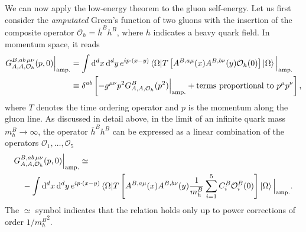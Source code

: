 We can now apply the low-energy theorem to the gluon self-energy. Let us first consider the \textit{amputated} Green's function of two gluons with the insertion of the composite operator $\mathcal{O}_h = \bar{h}^B h^B$, where $h$ indicates a heavy quark field. In momentum space, it reads
\begin{equation}
\begin{split}
G_{A,A,\mathcal{O}_h}^{B,ab\,\mu\nu} (p, 0) \Big \vert_{\text{amp.}} &=  \int \mathrm{d}^d x\, \mathrm{d}^d y\, e^{ip \cdot (x - y)} \braket{\Omega|T\left[ A^{B,a\mu}(x) A^{B, b\nu}(y) \mathcal{O}_h(0) \right]|\Omega} \Big \vert_{\text{amp.}} \\
& \equiv \delta^{ab} \left[-g^{\mu\nu} p^2 G_{A,A,\mathcal{O}_h}^B(p^2)\Big \vert_{\text{amp.}} + \text{terms proportional to } p^\mu p^\nu \right],
\end{split}
\end{equation}
where $T$ denotes the time ordering operator and $p$ is the momentum along the gluon line. As discussed in detail above, in the limit of an infinite quark mass $m_h^B \rightarrow \infty$, the operator $\bar{h}^B h^B$ can be expressed as a linear combination of the operators $\mathcal{O}_1,\ldots , \mathcal{O}_5$
\begin{equation}
\begin{split}
&G_{A,A,\mathcal{O}_h}^{B,ab\, \mu\nu} (p, 0) \Big \vert_{\text{amp.}} \simeq \\
&\quad - \int \mathrm{d}^d x\, \mathrm{d}^d y\, e^{ip\cdot (x - y)} \braket{\Omega| T \left[ A^{B,a\mu}(x) A^{B, b \nu}(y) \frac{1}{m_h^B} \sum_{i=1}^5 C_i^B \mathcal{O}_i^B(0) \right]|\Omega} \Big \vert_{\text{amp.}}.
\end{split}
\end{equation}
The $\simeq$ symbol indicates that the relation holds only up to power corrections of order $1/{m_h^B}^2$.

